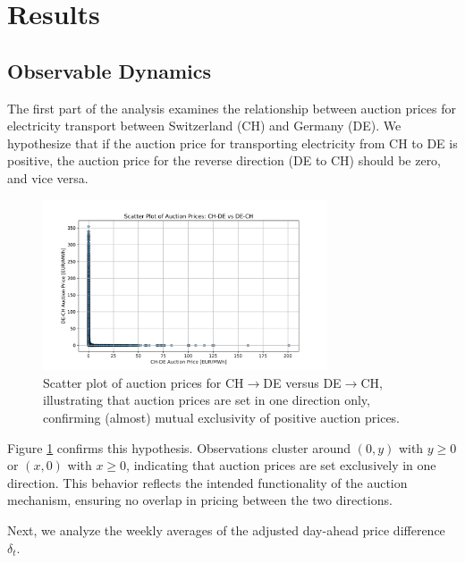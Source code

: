 \documentclass[12pt]{article}
\begin{document}
\section{Results}

\subsection{Observable Dynamics}

The first part of the analysis examines the relationship between auction prices for electricity transport between Switzerland (CH) and Germany (DE). We hypothesize that if the auction price for transporting electricity from CH to DE is positive, the auction price for the reverse direction (DE to CH) should be zero, and vice versa.

\begin{figure}[h!]
    \centering
    \includegraphics[width=0.75\textwidth]{figures/scatter_plot_ch_de_vs_de_ch_auction_prices.png}
    \caption{Scatter plot of auction prices for CH$\rightarrow$DE versus DE$\rightarrow$CH, illustrating that auction prices are set in one direction only, confirming (almost) mutual exclusivity of positive auction prices.}
    \label{fig:scatter_ch_de_auction}
\end{figure}

\noindent
Figure \ref{fig:scatter_ch_de_auction} confirms this hypothesis. Observations cluster around $(0, y)$ with $y \geq 0$ or $(x, 0)$ with $x \geq 0$, indicating that auction prices are set exclusively in one direction. This behavior reflects the intended functionality of the auction mechanism, ensuring no overlap in pricing between the two directions.

Next, we analyze the weekly averages of the adjusted day-ahead price difference $\delta_t$.
\end{document}
